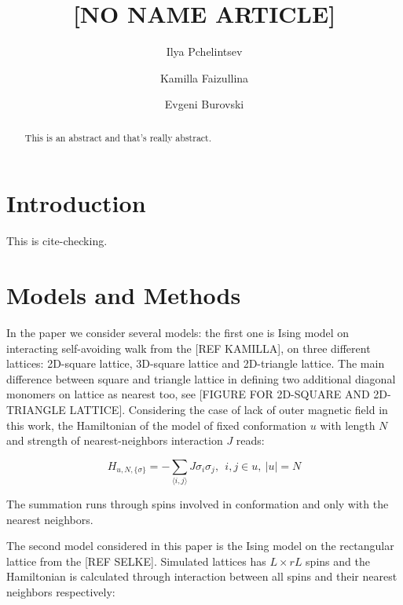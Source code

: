 \documentclass[aps,pre,amssymb,amsmath,twocolumn,floatfix]{revtex4-2}
\begin{document}
\title{[NO NAME ARTICLE]}

\author{Ilya Pchelintsev}
\author{Kamilla Faizullina}
\author{Evgeni Burovski}



\begin{abstract}
    This is an abstract and that's really abstract.
\end{abstract}

\maketitle

\section{Introduction}
This is cite-checking.\cite{Papale2018}

\section{Models and Methods}
In the paper we consider several models: the first one is Ising model on interacting self-avoiding walk from the [REF KAMILLA], on three different lattices: 2D-square lattice, 3D-square lattice and 2D-triangle lattice. The main difference between square and triangle lattice in defining two additional diagonal monomers on lattice as nearest too, see [FIGURE FOR 2D-SQUARE AND 2D-TRIANGLE LATTICE]. Considering the case of lack of outer magnetic field in this work, the Hamiltonian of the model of fixed conformation $u$ with length $N$ and strength of nearest-neighbors interaction $J$ reads:


\begin{equation}\label{H_Ising_ISAW}
  H_{u, N, \{\sigma\}} = - \sum_{\langle i,j \rangle} J  \sigma_{i}  \sigma_{j},\ \ i,j \in u,\ |u| = N
\end{equation}

The summation runs through spins involved in conformation and only with the nearest neighbors. 

The second model considered in this paper is the Ising model on the rectangular lattice from the [REF SELKE]. Simulated lattices has $L \times rL$ spins and the Hamiltonian is calculated through interaction between all spins and their nearest neighbors respectively:
\end{document}

